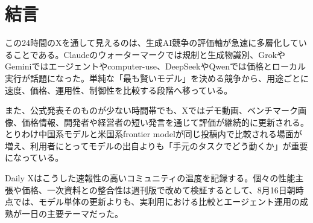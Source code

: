 \section*{結言}

この24時間のXを通して見えるのは、生成AI競争の評価軸が急速に多層化していることである。Claudeのウォーターマークでは規制と生成物識別、GrokやGeminiではエージェントやcomputer-use、DeepSeekやQwenでは価格とローカル実行が話題になった。単純な「最も賢いモデル」を決める競争から、用途ごとに速度、価格、運用性、制御性を比較する段階へ移っている。

また、公式発表そのものが少ない時間帯でも、Xではデモ動画、ベンチマーク画像、価格情報、開発者や経営者の短い発言を通じて評価が継続的に更新される。とりわけ中国系モデルと米国系frontier modelが同じ投稿内で比較される場面が増え、利用者にとってモデルの出自よりも「手元のタスクでどう動くか」が重要になっている。

Daily Xはこうした速報性の高いコミュニティの温度を記録する。個々の性能主張や価格、一次資料との整合性は週刊版で改めて検証するとして、8月16日朝時点では、モデル単体の更新よりも、実利用における比較とエージェント運用の成熟が一日の主要テーマだった。
